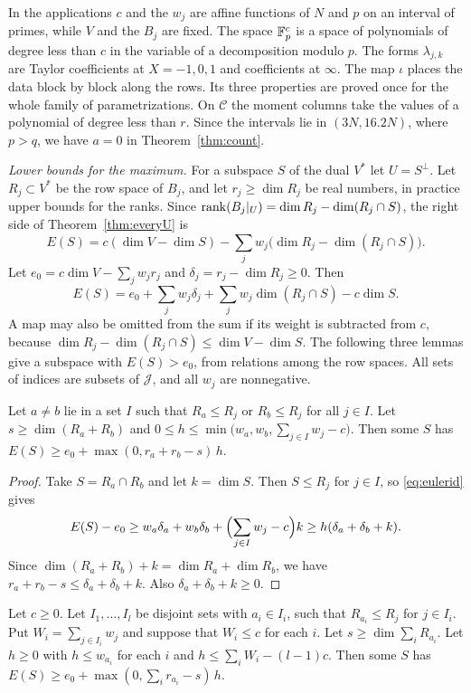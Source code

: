 In the applications $c$ and the $w_j$ are affine functions of $N$ and $p$ on an interval of primes, while $V$ and
the $B_j$ are fixed. The space $\mathbb F_p^c$ is a space of polynomials of degree less than $c$ in the variable of a
decomposition modulo $p$. The forms $\lambda_{j,k}$ are Taylor coefficients at $X=-1,0,1$ and coefficients at $\infty$. The map $\iota$ places the data block by block along the rows. Its three properties are proved once for the whole family of parametrizations. On $\mathcal C$ the moment columns take the
values of a polynomial of degree less than $r$. Since the intervals lie in $(3N,16.2N)$, where $p>q$, we have $a=0$ in
Theorem~\ref{thm:count}.

\emph{Lower bounds for the maximum.} For a subspace $S$ of the dual $V^*$ let $U=S^\perp$. Let $R_j\subset V^*$ be the row space of $B_j$, and let $r_j\ge\dim R_j$ be real
numbers, in practice upper bounds for the ranks. Since $\operatorname{rank}(B_j|_U)=\dim R_j-\dim(R_j\cap S)$, the right side of Theorem~\ref{thm:everyU} is
\[
 E(S)=c(\dim V-\dim S)-\sum_jw_j\bigl(\dim R_j-\dim(R_j\cap S)\bigr).
\]
Let $e_0=c\dim V-\sum_jw_jr_j$ and $\delta_j=r_j-\dim R_j\ge0$. Then
\begin{equation}\label{eq:eulerid}
 E(S)=e_0+\sum_jw_j\delta_j+\sum_jw_j\dim(R_j\cap S)-c\dim S .
\end{equation}
A map may also be omitted from the sum if its weight is subtracted from $c$, because $\dim R_j-\dim(R_j\cap S)\le\dim V-\dim S$. The following three lemmas give a subspace
with $E(S)>e_0$, from relations among the row spaces. All sets of indices are subsets of $\mathcal J$, and all $w_j$ are nonnegative.

\begin{lemma}[pair]\label{lem:pairU}
Let $a\ne b$ lie in a set $I$ such that $R_a\le R_j$ or $R_b\le R_j$ for all $j\in I$. Let
$s\ge\dim(R_a+R_b)$ and $0\le h\le\min\bigl(w_a,w_b,\sum_{j\in I}w_j-c\bigr)$. Then some $S$ has
$E(S)\ge e_0+\max(0,r_a+r_b-s)\,h$.
\end{lemma}

\begin{proof}
Take $S=R_a\cap R_b$ and let $k=\dim S$. Then $S\le R_j$ for $j\in I$, so \eqref{eq:eulerid} gives
\[
 E(S)-e_0\ge w_a\delta_a+w_b\delta_b+\Bigl(\sum_{j\in I}w_j-c\Bigr)k\ge h(\delta_a+\delta_b+k).
\]
Since $\dim(R_a+R_b)+k=\dim R_a+\dim R_b$, we have $r_a+r_b-s\le\delta_a+\delta_b+k$. Also $\delta_a+\delta_b+k\ge0$.
\end{proof}

\begin{lemma}\label{lem:pointsU}
Let $c\ge0$. Let $I_1,\ldots,I_l$ be disjoint sets with $a_i\in I_i$, such that $R_{a_i}\le R_j$ for $j\in I_i$. Put $W_i=\sum_{j\in I_i}w_j$ and suppose that $W_i\le c$ for each $i$.
Let $s\ge\dim\sum_iR_{a_i}$. Let $h\ge0$ with $h\le w_{a_i}$ for each $i$ and $h\le\sum_iW_i-(l-1)c$. Then some $S$ has
$E(S)\ge e_0+\max(0,\sum_ir_{a_i}-s)\,h$.
\end{lemma}

